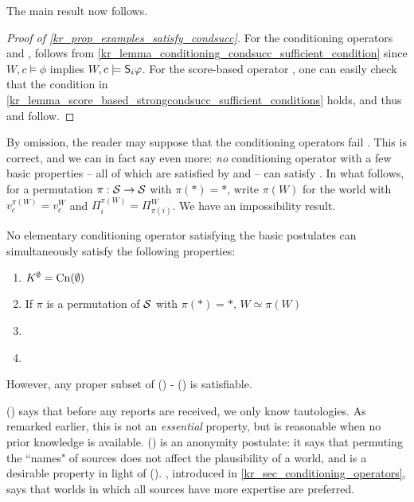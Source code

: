The main result now follows.

\begin{proof}[Proof of \cref{kr_prop_examples_satisfy_condsucc}]
    For the conditioning operators \varbasedcond{} and \partbasedcond{},
    \condsucc{} follows from
    \cref{kr_lemma_conditioning_condsucc_sufficient_condition} since $W, c \models
    \phi$ implies $W, c \models \S_i\phi$. For the score-based operator
    \scorebasedop{}, one can easily check that the condition in
    \cref{kr_lemma_score_based_strongcondsucc_sufficient_conditions} holds, and
    thus \strongcondsucc{} and \condsucc{} follow.
\end{proof}

By omission, the reader may suppose that the conditioning operators fail
\strongcondsucc{}. This is correct, and we can in fact say even more: \emph{no}
conditioning operator with a few basic properties -- all of which are satisfied
by \varbasedcond{} and \partbasedcond{} -- can satisfy \strongcondsucc{}.
%
In what follows, for a permutation $\pi: \srcs \to \srcs$ with $\pi(\ast) = \ast$,
write $\pi(W)$ for the world with $v^{\pi(W)}_c = v^W_c$ and $\Pi^{\pi(W)}_i =
\Pi^W_{\pi(i)}$. We have an impossibility result.

\begin{proposition}
    \label{kr_prop_strongcondsucc_conditioning_impossibilitity}
    No elementary conditioning operator satisfying the basic postulates can
    simultaneously satisfy the following properties:
    \begin{enumerate}
        \item \label{kr_item_conditioning_impossibility_first}
              $K^\emptyset = \cn(\emptyset)$

        \item \label{kr_item_anonymity}
              If $\pi$ is a permutation of $\srcs$ with $\pi(\ast) = \ast$, $W
              \simeq \pi(W)$

        \item {}

        \item \label{kr_item_conditioning_impossibility_last} \strongcondsucc{}
    \end{enumerate}
    However, any proper subset of
    () -
    () is satisfiable.
\end{proposition}

() says that before any
reports are received, we only know tautologies. As remarked earlier, this is
not an \emph{essential} property, but is reasonable when no prior knowledge is
available. () is an anonymity postulate: it says that
permuting the ``names" of sources does not affect the plausibility of a world,
and is a desirable property in light of
(). , introduced
in \cref{kr_sec_conditioning_operators}, says that worlds in which all sources
have more expertise are preferred.

